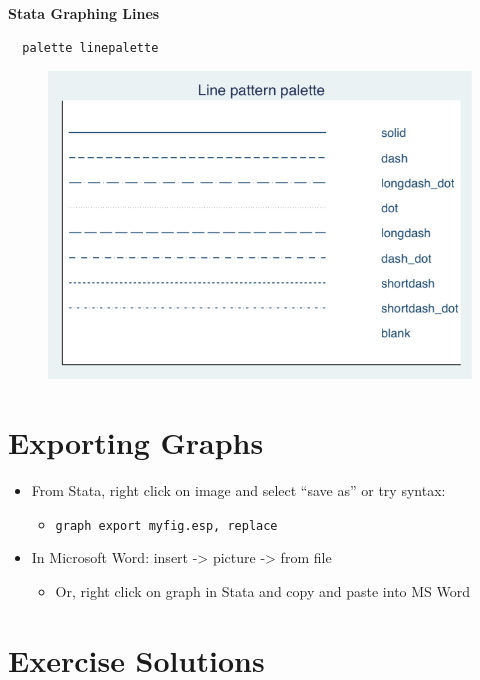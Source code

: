 \documentclass[]{book}
\providecommand{\tightlist}{%
  \setlength{\itemsep}{0pt}\setlength{\parskip}{0pt}}
\begin{document}
\textbf{Stata Graphing Lines}

\begin{verbatim}
  palette linepalette
\end{verbatim}

\begin{figure}
\centering
\includegraphics{Stata/StataModGraph/images/linepalette.png}
\caption{}
\end{figure}

\section{Exporting Graphs}\label{exporting-graphs}

\begin{itemize}
\tightlist
\item
  From Stata, right click on image and select ``save as'' or try syntax:

  \begin{itemize}
  \tightlist
  \item
    \texttt{graph\ export\ myfig.esp,\ replace}
  \end{itemize}
\item
  In Microsoft Word: insert -\textgreater{} picture -\textgreater{} from
  file

  \begin{itemize}
  \tightlist
  \item
    Or, right click on graph in Stata and copy and paste into MS Word
  \end{itemize}
\end{itemize}

\section{Exercise Solutions}\label{exercise-solutions-8}
\end{document}
